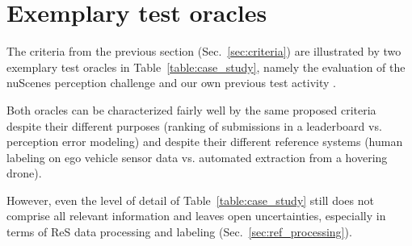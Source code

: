 \documentclass[conference]{IEEEtran}
\begin{document}



\section{Exemplary test oracles}
\label{sec:case_studies}


The criteria from the previous section (Sec.~\ref{sec:criteria}) are illustrated by two exemplary test oracles in Table~\ref{table:case_study}, namely the evaluation of the nuScenes perception challenge \cite{caesar2019nuscenes} and our own previous test activity \cite{Krajewski2020UsingDrones}. 


Both oracles can be characterized fairly well by the same proposed criteria despite their different purposes (ranking of submissions in a leaderboard vs. perception error modeling) and despite their different reference systems (human labeling on ego vehicle sensor data vs. automated extraction from a hovering drone).


However, even the level of detail of Table~\ref{table:case_study} still does not comprise all relevant information and leaves open uncertainties, especially in terms of ReS data processing and labeling (Sec.~\ref{sec:ref_processing}).






\end{document}
